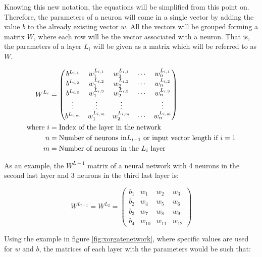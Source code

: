 Knowing this new notation, the equations will be simplified from this point on. Therefore, the parameters of a neuron will come in a single vector by adding the value $b$ to the already existing vector $w$. All the vectors will be grouped forming a matrix $W$, where each row will be the vector associated with a neuron. That is, the parameters of a layer $L_i$ will be given as a matrix which will be referred to as $W$.


\begin{equation}
\centering
    \begin{split}
    W^{L_i} &= \begin{pmatrix}
  b^{L_{i,1}} & w^{L_{i, 1}}_1 & w^{L_{i, 1}}_2 & \cdots & w^{L_{i, 1}}_n \\
  b^{L_{i,2}} & w^{L_{i, 2}}_1 & w^{L_{i, 2}}_2 & \cdots & w^{L_{i, 2}}_n \\
  b^{L_{i,3}} & w^{L_{i, 3}}_1 & w^{L_{i, 3}}_2 & \cdots & w^{L_{i, 3}}_n \\
  \vdots & \vdots  & \vdots & & \vdots \\
  b^{L_{i,m}} & w^{L_{i, m}}_1 & w^{L_{i, m}}_2 & \cdots & w^{L_{i, m}}_n
  \end{pmatrix} \\ 
    \text{where}~i &= \text{Index of the layer in the network} \\
  ~n &= \text{Number of neurons in} L_{i-1}\text{ or input vector length if } i=1 \\
  ~m &= \text{Number of neurons in the } L_i \text{ layer}
  \end{split}
  \label{examplenn51}
\end{equation}

As an example, the $W^{L-1}$ matrix of a neural network with 4 neurons in the second last layer and 3 neurons in the third last layer is:

\begin{equation}
  W^{L_{l-1}} = W^{L_2} = \begin{pmatrix}
  b_1 & w_1 & w_2 & w_3 \\
  b_2 & w_4 & w_5 & w_6 \\ 
  b_3 & w_7 & w_8 & w_9 \\ 
  b_4 & w_{10} & w_{11} & w_{12}
  \end{pmatrix} 
  \label{eqn:matrixlayer}
\end{equation}


Using the example in figure \ref{fig:xorgatenetwork}, where specific values are used for $w$ and $b$, the matrices of each layer with the parameters would be such that:

